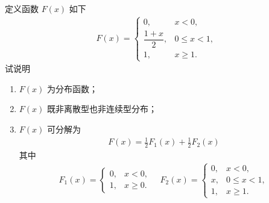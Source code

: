 \begin{frame}
	\begin{exam}
		定义函数 $F (x)$ 如下
		\begin{eqnarray*}
			F(x)=\left\{
			\begin{array}{ll}
				0,              & x< 0,      \\
				\dfrac{1+x}{2}, & 0\le x< 1, \\
				1,              & x\ge 1.
			\end{array}
			\right.
		\end{eqnarray*}
		试说明  \begin{enumerate}
			\item $F (x)$ 为分布函数；
			\item $F (x)$ 既非离散型也非连续型分布；
			\item $F (x)$ 可分解为
			      \begin{eqnarray*}
				      F(x)=\frac{1}{2}F_1(x)+\frac{1}{2}F_2(x)
			      \end{eqnarray*}
			      \pause  其中 \begin{eqnarray*}
				      F_1(x)=\left\{
				      \begin{array}{ll}
					      0, & x< 0,    \\
					      1, & x\ge 0.
				      \end{array}
				      \right.
				      \quad  F_2(x)=\left\{\begin{array}{ll}
					      0, & x<0,       \\
					      x, & 0\le x< 1, \\
					      1, & x\ge 1.
				      \end{array}
				      \right.
			      \end{eqnarray*}
		\end{enumerate}

	\end{exam}
\end{frame}


